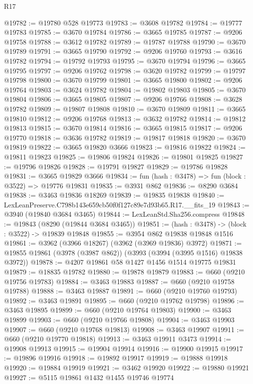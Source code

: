 \begin{lexlean}{R17}
\begin{coremodule}
@19782 := @19780 @528 @19773
@19783 := @3608 @19782
@19784 := @19777 @19783
@19785 := @3670 @19784
@19786 := @3665 @19785
@19787 := @9206 @19758
@19788 := @3612 @19782
@19789 := @19787 @19788
@19790 := @3670 @19789
@19791 := @3665 @19790
@19792 := @9206 @19760
@19793 := @3616 @19782
@19794 := @19792 @19793
@19795 := @3670 @19794
@19796 := @3665 @19795
@19797 := @9206 @19762
@19798 := @3620 @19782
@19799 := @19797 @19798
@19800 := @3670 @19799
@19801 := @3665 @19800
@19802 := @9206 @19764
@19803 := @3624 @19782
@19804 := @19802 @19803
@19805 := @3670 @19804
@19806 := @3665 @19805
@19807 := @9206 @19766
@19808 := @3628 @19782
@19809 := @19807 @19808
@19810 := @3670 @19809
@19811 := @3665 @19810
@19812 := @9206 @19768
@19813 := @3632 @19782
@19814 := @19812 @19813
@19815 := @3670 @19814
@19816 := @3665 @19815
@19817 := @9206 @19770
@19818 := @3636 @19782
@19819 := @19817 @19818
@19820 := @3670 @19819
@19822 := @3665 @19820 @3666
@19823 := @19816 @19822
@19824 := @19811 @19823
@19825 := @19806 @19824
@19826 := @19801 @19825
@19827 := @19796 @19826
@19828 := @19791 @19827
@19829 := @19786 @19828
@19831 := @3665 @19829 @3666
@19834 := fun (hash : @3478) => fun (block : @3522) => @19776 @19831
@19835 := @3931 @862
@19836 := @8290 @3684
@19838 := @3463 @19836 @18269
@19839 := @19835 @19838
@19840 := LexLeanPreserve.C798b143e659cb50f0f127c89e7d93b65.R17.__fits_19
@19843 := @3940 (@19840 @3684 @3465)
@19844 := LexLeanStd.Sha256.compress
@19848 := @19843 (@8290 (@19844 @3684 @3465))
@19851 := (hash : @3478) -> (block : @3522) -> @19839 @19848
@19855 := @3954 @862 @19838 @19848 @1516
@19861 := @3962 (@3966 @18267) (@3962 (@3969 @19836) @3972)
@19871 := @19855 @19861 (@3978 (@3987 @862)) (@3993 (@3994 (@3995 @1516) @19838 @3972))
@19878 := @4207 @19861 @58 @1427 @1456 @1514 @19775 @19831
@19879 := @18835 @19782
@19880 := @19878 @19879
@19883 := @660 (@9210 @19756 @19783)
@19884 := @3463 @19883
@19887 := @660 (@9210 @19758 @19788)
@19888 := @3463 @19887
@19891 := @660 (@9210 @19760 @19793)
@19892 := @3463 @19891
@19895 := @660 (@9210 @19762 @19798)
@19896 := @3463 @19895
@19899 := @660 (@9210 @19764 @19803)
@19900 := @3463 @19899
@19903 := @660 (@9210 @19766 @19808)
@19904 := @3463 @19903
@19907 := @660 (@9210 @19768 @19813)
@19908 := @3463 @19907
@19911 := @660 (@9210 @19770 @19818)
@19913 := @3463 @19911 @3473
@19914 := @19908 @19913
@19915 := @19904 @19914
@19916 := @19900 @19915
@19917 := @19896 @19916
@19918 := @19892 @19917
@19919 := @19888 @19918
@19920 := @19884 @19919
@19921 := @3462 @19920
@19922 := @19880 @19921
@19927 := @5115 @19861 @1432 @1455 @19746 @19774

\end{coremodule}
\end{lexlean}
